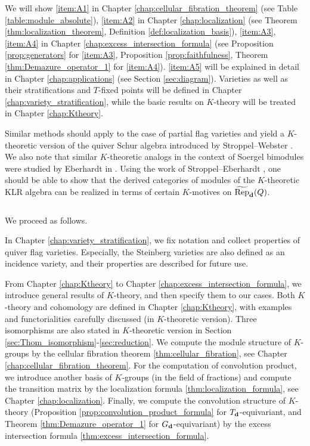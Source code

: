 We will show \eqref{item:A1} in Chapter \ref{chap:cellular_fibration_theorem} (see Table \ref{table:module_absolute}), \eqref{item:A2} in Chapter \ref{chap:localization} (see Theorem \ref{thm:localization_theorem}, Definition \ref{def:localization_basis}), \eqref{item:A3}, \eqref{item:A4} in Chapter \ref{chap:excess_intersection_formula} (see Proposition \ref{prop:generators} for \eqref{item:A3}, Proposition \ref{prop:faithfulness}, Theorem \ref{thm:Demazure_operator_1} for \eqref{item:A4}). \eqref{item:A5} will be explained in detail in Chapter \ref{chap:applications} (see Section \ref{sec:diagram}). Varieties as well as their stratifications and $T$-fixed points will be defined in Chapter \ref{chap:variety_stratification}, while the basic results on $K$-theory will be treated in Chapter \ref{chap:Ktheory}.

Similar methods should apply to the case of partial flag varieties and yield a $K$-theoretic version of the quiver Schur algebra introduced by Stroppel--Webster \cite{https://doi.org/10.48550/arxiv.1110.1115}. We also note that similar $K$-theoretic analogs in the context of Soergel bimodules were studied by Eberhardt in  \cite{Eberhardt2022Koszul,https://doi.org/10.48550/arxiv.2208.01665}. Using the work of Stroppel--Eberhardt \cite{eberhardt2022motivic}, one should be able to show that the derived categories of modules of the $K$-theoretic KLR algebra can be realized in terms of certain $K$-motives on $\operatorname{\widetilde{\operatorname{Rep}}}_{\mathbf{d}}(Q)$.

$\,$

We proceed as follows.

In Chapter \ref{chap:variety_stratification}, we fix notation and collect properties of quiver flag varieties. Especially, the Steinberg varieties are also defined as an incidence variety, and their properties are described for future use.

From Chapter \ref{chap:Ktheory} to Chapter \ref{chap:excess_intersection_formula}, we introduce general results of $K$-theory, and then specify them to our cases. Both $K$-theory and cohomology are defined in Chapter \ref{chap:Ktheory}, with examples and functorialities carefully discussed (in $K$-theoretic version). Three isomorphisms are also stated in $K$-theoretic version in Section \ref{sec:Thom_isomorphism}-\ref{sec:reduction}. We compute the module structure of $K$-groups by the cellular fibration theorem \ref{thm:cellular_fibration}, see Chapter \ref{chap:cellular_fibration_theorem}. For the computation of convolution product, we introduce another basis of $K$-groups (in the field of fractions) and compute the transition matrix by the localization formula \ref{thm:localization_formula}, see Chapter \ref{chap:localization}. Finally, we compute the convolution structure of $K$-theory (Proposition \ref{prop:convolution_product_formula} for $T_{\mathbf{d}}$-equivariant, and Theorem \ref{thm:Demazure_operator_1} for $G_{\mathbf{d}}$-equivariant) by the excess intersection formula \ref{thm:excess_intersection_formula}.

